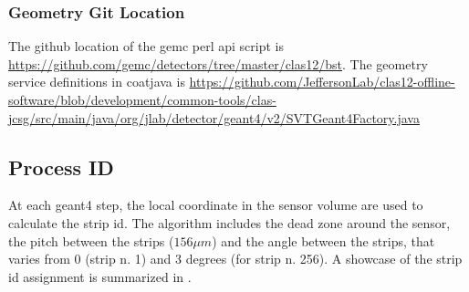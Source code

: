 \subsubsection{Geometry Git Location}
The github location of the gemc perl api script is \url{https://github.com/gemc/detectors/tree/master/clas12/bst}.
The geometry service definitions in coatjava is \url{https://github.com/JeffersonLab/clas12-offline-software/blob/development/common-tools/clas-jcsg/src/main/java/org/jlab/detector/geant4/v2/SVTGeant4Factory.java}


\subsection{Process ID}

At each geant4 step, the local coordinate in the sensor volume are used to calculate the strip id.
The algorithm includes the dead zone around the sensor, the pitch between the strips ($156 \mu m$) and the angle
between the strips, that varies from 0 (strip n. 1) and 3 degrees (for strip n. 256). A showcase of the strip id assignment
is summarized in .

